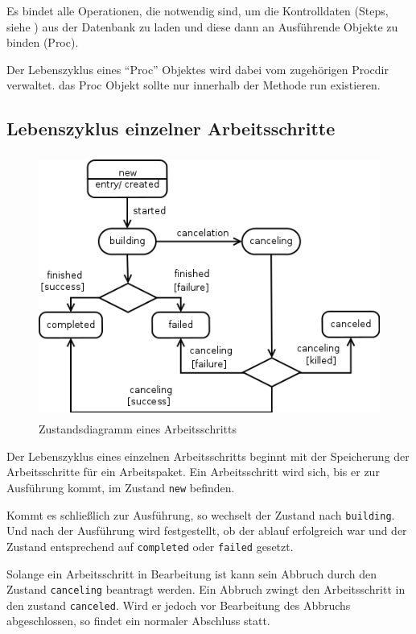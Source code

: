 Es bindet alle Operationen, die notwendig sind,
um die Kontrolldaten (Steps, siehe )
aus der Datenbank zu laden und diese dann an Ausführende Objekte zu binden (Proc).

Der Lebenszyklus eines ``Proc'' Objektes wird dabei vom zugehörigen Procdir verwaltet.
das Proc Objekt sollte nur innerhalb der Methode run existieren.


\subsection{Lebenszyklus einzelner Arbeitsschritte}


\begin{figure}[ht] 
    \centering
    \includegraphics[height=3.4in]{imageinput/lebenszyklus-arbeitsschritt.png}
    \caption{Zustandsdiagramm eines Arbeitsschritts}
    \label{fig:lebenszyklus-arbeitsschritt}
\end{figure}

Der Lebenszyklus eines einzelnen Arbeitsschritts beginnt mit der Speicherung der Arbeitsschritte für ein Arbeitspaket. Ein Arbeitsschritt wird sich, bis er zur Ausführung kommt, im Zustand \verb|new| befinden.

Kommt es schließlich zur Ausführung, so wechselt der Zustand nach \verb|building|.
Und nach der Ausführung wird festgestellt, ob der ablauf erfolgreich war und der Zustand entsprechend auf \verb|completed| oder \verb|failed| gesetzt.

Solange ein Arbeitsschritt in Bearbeitung ist kann sein Abbruch
durch den Zustand \verb|canceling| beantragt werden.
Ein Abbruch zwingt den Arbeitsschritt in den zustand \verb|canceled|.
Wird er jedoch vor Bearbeitung des Abbruchs abgeschlossen,
so findet ein normaler Abschluss statt.

